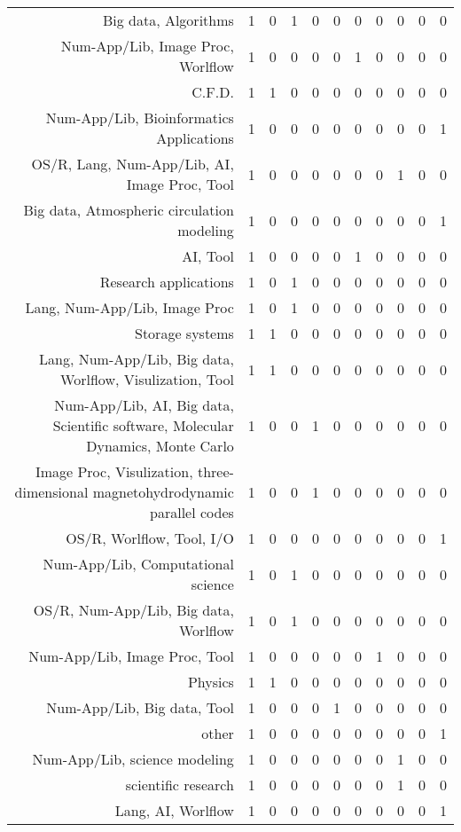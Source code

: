 {\begin{landscape}
\begin{longtable}[htb]{r|c|c|c|c|c|c|c|c|c|c}
{Big data, Algorithms} & 1 & 0 & 1 & 0 & 0 & 0 & 0 & 0 & 0 & 0 \\%
{Num-App/Lib, Image Proc, Worlflow} & 1 & 0 & 0 & 0 & 0 & 1 & 0 & 0 & 0 & 0 \\%
{C.F.D.} & 1 & 1 & 0 & 0 & 0 & 0 & 0 & 0 & 0 & 0 \\%
{Num-App/Lib, Bioinformatics Applications} & 1 & 0 & 0 & 0 & 0 & 0 & 0 & 0 & 0 & 1 \\%
{OS/R, Lang, Num-App/Lib, AI, Image Proc, Tool} & 1 & 0 & 0 & 0 & 0 & 0 & 0 & 1 & 0 & 0 \\%
{Big data, Atmospheric circulation modeling} & 1 & 0 & 0 & 0 & 0 & 0 & 0 & 0 & 0 & 1 \\%
{AI, Tool} & 1 & 0 & 0 & 0 & 0 & 1 & 0 & 0 & 0 & 0 \\%
{Research applications} & 1 & 0 & 1 & 0 & 0 & 0 & 0 & 0 & 0 & 0 \\%
{Lang, Num-App/Lib, Image Proc} & 1 & 0 & 1 & 0 & 0 & 0 & 0 & 0 & 0 & 0 \\%
{Storage systems} & 1 & 1 & 0 & 0 & 0 & 0 & 0 & 0 & 0 & 0 \\%
{Lang, Num-App/Lib, Big data, Worlflow, Visulization, Tool} & 1 & 1 & 0 & 0 & 0 & 0 & 0 & 0 & 0 & 0 \\%
{Num-App/Lib, AI, Big data, Scientific software, Molecular Dynamics, Monte Carlo} & 1 & 0 & 0 & 1 & 0 & 0 & 0 & 0 & 0 & 0 \\%
{Image Proc, Visulization, three-dimensional magnetohydrodynamic parallel codes} & 1 & 0 & 0 & 1 & 0 & 0 & 0 & 0 & 0 & 0 \\%
{OS/R, Worlflow, Tool, I/O} & 1 & 0 & 0 & 0 & 0 & 0 & 0 & 0 & 0 & 1 \\%
{Num-App/Lib, Computational science} & 1 & 0 & 1 & 0 & 0 & 0 & 0 & 0 & 0 & 0 \\%
{OS/R, Num-App/Lib, Big data, Worlflow} & 1 & 0 & 1 & 0 & 0 & 0 & 0 & 0 & 0 & 0 \\%
{Num-App/Lib, Image Proc, Tool} & 1 & 0 & 0 & 0 & 0 & 0 & 1 & 0 & 0 & 0 \\%
{Physics} & 1 & 1 & 0 & 0 & 0 & 0 & 0 & 0 & 0 & 0 \\%
{Num-App/Lib, Big data, Tool} & 1 & 0 & 0 & 0 & 1 & 0 & 0 & 0 & 0 & 0 \\%
{other} & 1 & 0 & 0 & 0 & 0 & 0 & 0 & 0 & 0 & 1 \\%
{Num-App/Lib, science modeling} & 1 & 0 & 0 & 0 & 0 & 0 & 0 & 1 & 0 & 0 \\%
{scientific research} & 1 & 0 & 0 & 0 & 0 & 0 & 0 & 1 & 0 & 0 \\%
{Lang, AI, Worlflow} & 1 & 0 & 0 & 0 & 0 & 0 & 0 & 0 & 0 & 1 \\%

\end{longtable}
\end{landscape}}
